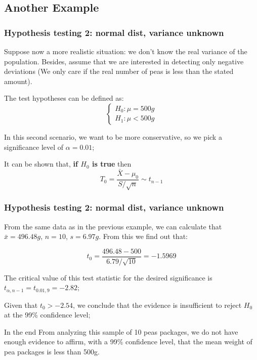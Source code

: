 \documentclass[10pt]{beamer}
\begin{document}
\subsection{Another Example}
\begin{frame}
  \frametitle{Hypothesis testing 2: normal dist, variance unknown}
  Suppose now a more realistic situation: we don't know the real
  variance of the population. Besides, assume that we are interested
  in detecting only negative deviations (We only care if the real
  number of peas is less than the stated amount).
  
  \bigskip
  
  The test hypotheses can be defined as: 
  \begin{equation*}
    \begin{cases}
      H_0 : \mu = 500g\\
      H_1 : \mu < 500g
    \end{cases}
  \end{equation*}

  \bigskip

  In this second scenario, we want to be more conservative, so we pick
  a significance level of $\alpha = 0.01$;
  
  \bigskip

  It can be shown that, {\bf if $H_0$ is true} then
  \begin{equation*}
    T_0 = \frac{\bar{X} - \mu_0}{S/\sqrt{n}}\sim t_{n-1}
  \end{equation*}
\end{frame}

\begin{frame}
  \frametitle{Hypothesis testing 2: normal dist, variance unknown}
  From the same data as in the previous example, we can calculate that 
  $\bar{x} = 496.48g$, $n = 10$, $s=6.97g$. From this we find out that:

  \bigskip

  \begin{equation*}
    t_0 = \frac{496.48 - 500}{6.79/\sqrt{10}} = -1.5969
  \end{equation*}

  \bigskip

  The critical value of this test statistic for the desired
  significance is $t_{\alpha,n-1} = t_{0.01,9} = -2.82$;

  \bigskip

  Given that $t_0 > -2.54$, we conclude that the evidence is
  insufficient to reject $H_0$ at the 99\% confidence level;
  
  \begin{block}{In the end}
    From analyzing this sample of 10 peas packages, we do not have
    enough evidence to affirm, with a 99\% confidence level, that the
    mean weight of pea packages is less than 500g. 
  \end{block}

\end{frame}
\end{document}
